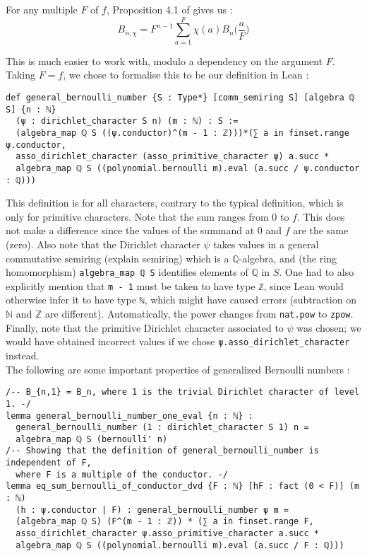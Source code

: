 \documentclass[a4paper,UKenglish,cleveref, autoref, thm-restate]{lipics-v2021}
\newcommand{\lean}[1]{\texttt{#1}\xspace} %
\begin{document}
For any multiple $F$ of $f$, Proposition 4.1 of \cite{cyc} gives us : 
$$ B_{n, \chi} = F^{n - 1} \sum_{a = 1}^{F} \chi (a) B_n \bigg( \frac{a}{F} \bigg) $$

This is much easier to work with, modulo a dependency on the argument $F$. Taking $F = f$, we chose to formalise this 
to be our definition in Lean :
\begin{lstlisting}
def general_bernoulli_number {S : Type*} [comm_semiring S] [algebra ℚ S] {n : ℕ} 
  (ψ : dirichlet_character S n) (m : ℕ) : S :=
  (algebra_map ℚ S ((ψ.conductor)^(m - 1 : ℤ)))*(∑ a in finset.range ψ.conductor,
  asso_dirichlet_character (asso_primitive_character ψ) a.succ * 
  algebra_map ℚ S ((polynomial.bernoulli m).eval (a.succ / ψ.conductor : ℚ)))
\end{lstlisting}

This definition is for all characters, contrary to the typical definition, which is only for primitive characters. 
Note that the sum ranges from 0 to $f$. This does not make a difference since the 
values of the summand at 0 and $f$ are the same (zero). Also note that the Dirichlet 
character $\psi$ takes values in a general commutative semiring (explain semiring) 
which is a $\mathbb{Q}$-algebra, and (the ring homomorphism) \lean{algebra\_map ℚ S} 
identifies elements of $\mathbb{Q}$ in $S$. One had to also explicitly mention that 
\lean{m - 1} must be taken to have type \lean{ℤ}, since Lean would otherwise infer 
it to have type \lean{ℕ}, which might have caused errors (subtraction on $\mathbb{N}$ 
and $\mathbb{Z}$ are different). Automatically, the power changes from \lean{nat.pow} to 
\lean{zpow}. Finally, note that the primitive Dirichlet character associated to $\psi$ was 
chosen; we would have obtained incorrect values if we chose \lean{ψ.asso\_dirichlet\_character} instead. \\ 

The following are some important properties of generalized Bernoulli numbers : 
\begin{lstlisting}
/-- B_{n,1} = B_n, where 1 is the trivial Dirichlet character of level 1. -/
lemma general_bernoulli_number_one_eval {n : ℕ} :
  general_bernoulli_number (1 : dirichlet_character S 1) n = 
  algebra_map ℚ S (bernoulli' n) 
/-- Showing that the definition of general_bernoulli_number is independent of F,
  where F is a multiple of the conductor. -/
lemma eq_sum_bernoulli_of_conductor_dvd {F : ℕ} [hF : fact (0 < F)] (m : ℕ) 
  (h : ψ.conductor | F) : general_bernoulli_number ψ m = 
  (algebra_map ℚ S) (F^(m - 1 : ℤ)) * (∑ a in finset.range F, 
  asso_dirichlet_character ψ.asso_primitive_character a.succ *
  algebra_map ℚ S ((polynomial.bernoulli m).eval (a.succ / F : ℚ))) 
\end{lstlisting}
\end{document}
